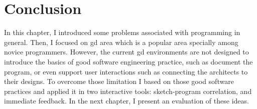 \section{Conclusion}

In this chapter, I introduced some problems associated with programming in general. Then, I focused on \gls{gd} area which is a popular area specially among novice programmers. However, the current \gls{gd} environments are not designed to introduce the basics of good software engineering practice, such as document the program, or even support user interactions such as connecting the architects to their designs. To overcome those limitation I based on those good software practices and applied it in two interactive tools: sketch-program correlation, and immediate feedback. In the next chapter, I present an evaluation of these ideas.